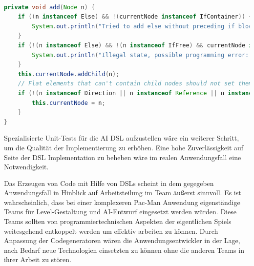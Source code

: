 \documentclass[conference]{IEEEtran}
\begin{document}
\begin{lstlisting}[language=Java, captionpos=b, caption=Grundliegende Validierung beim Hinzufügen eines einer Node in \texttt{AiBaseListenerImplementation}, label=validation_intent]

private void add(Node n) {
    if ((n instanceof Else) && !(currentNode instanceof IfContainer)) {
        System.out.println("Tried to add else without preceding if block");
    }
    if (!(n instanceof Else) && !(n instanceof IfFree) && currentNode instanceof IfContainer) {
        System.out.println("Illegal state, possible programming error: Opened an IfContainer and trying to add other than if or else block.");
    }
    this.currentNode.addChild(n);
    // Flat elements that can't contain child nodes should not set themselves as currentNode
    if (!(n instanceof Direction || n instanceof Reference || n instanceof Assignment)) {
        this.currentNode = n;
    }
}

\end{lstlisting}

Spezialisierte Unit-Tests für die AI DSL aufzustellen wäre ein weiterer Schritt, um die Qualität der Implementierung zu erhöhen. Eine hohe Zuverlässigkeit auf Seite der DSL Implementation zu beheben wäre im realen Anwendungsfall eine Notwendigkeit.

Das Erzeugen von Code mit Hilfe von DSLs scheint in dem gegegeben Anwendungsfall in Hinblick auf Arbeitsteilung im Team äußerst sinnvoll. Es ist wahrscheinlich, dass bei einer komplexeren Pac-Man Anwendung eigenständige Teams für Level-Gestaltung und AI-Entwurf eingesetzt werden würden. Diese Teams sollten von programmiertechnischen Aspekten der eigentlichen Spiels weitesgehend entkoppelt werden um effektiv arbeiten zu können. Durch Anpassung der Codegeneratoren wären die Anwendungsentwickler in der Lage, nach Bedarf neue Technologien einsetzten zu können ohne die anderen Teams in ihrer Arbeit zu stören.
\end{document}
